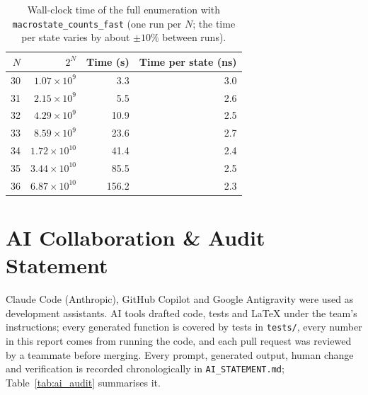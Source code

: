 \documentclass[11pt,a4paper]{article}
\begin{document}
\begin{table}[htbp]\centering\small
\caption{Wall-clock time of the full enumeration with \texttt{macrostate\_counts\_fast} (one run per $N$; the time per state varies by about $\pm10\%$ between runs).}\label{tab:benchmark}
\begin{tabular}{@{}rrrr@{}}
\toprule
$N$ & $2^N$ & Time (s) & Time per state (ns) \\
\midrule
30 & $1.07\times10^{9}$ & 3.3 & 3.0 \\
31 & $2.15\times10^{9}$ & 5.5 & 2.6 \\
32 & $4.29\times10^{9}$ & 10.9 & 2.5 \\
33 & $8.59\times10^{9}$ & 23.6 & 2.7 \\
34 & $1.72\times10^{10}$ & 41.4 & 2.4 \\
35 & $3.44\times10^{10}$ & 85.5 & 2.5 \\
36 & $6.87\times10^{10}$ & 156.2 & 2.3 \\
\bottomrule
\end{tabular}
\end{table}



\section{AI Collaboration \& Audit Statement}
\label{sec:ai_statement}

Claude Code (Anthropic), GitHub Copilot and Google Antigravity were used as development assistants. AI tools drafted code, tests and LaTeX under the team's instructions; every generated function is covered by tests in \texttt{tests/}, every number in this report comes from running the code, and each pull request was reviewed by a teammate before merging. Every prompt, generated output, human change and verification is recorded chronologically in \texttt{AI\_STATEMENT.md}; Table~\ref{tab:ai_audit} summarises it.
\end{document}
